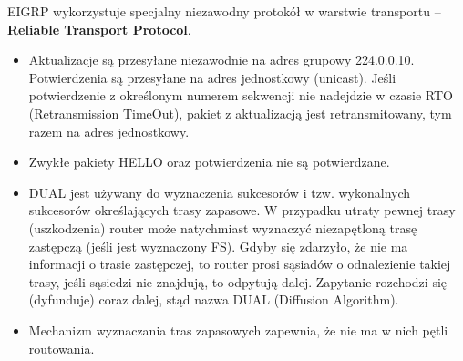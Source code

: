 \documentclass[../main.tex]{subfiles}
\begin{document}
    EIGRP wykorzystuje specjalny niezawodny protokół w warstwie transportu – \textbf{Reliable
    Transport Protocol}.
    \begin{itemize}
        \item Aktualizacje są przesyłane niezawodnie na adres grupowy 224.0.0.10. Potwierdzenia są przesyłane na adres
        jednostkowy (unicast). Jeśli potwierdzenie z określonym numerem sekwencji nie nadejdzie w
        czasie RTO (Retransmission TimeOut), pakiet z aktualizacją jest retransmitowany, tym razem
        na adres jednostkowy.
        \item Zwykłe pakiety HELLO oraz potwierdzenia nie są potwierdzane.
        \item DUAL jest używany do wyznaczenia sukcesorów i tzw. wykonalnych
        sukcesorów określających trasy zapasowe. W przypadku utraty pewnej trasy (uszkodzenia) router może natychmiast wyznaczyć
        niezapętloną trasę zastępczą (jeśli jest wyznaczony FS).  Gdyby się zdarzyło, że nie ma
        informacji o trasie zastępczej, to router prosi sąsiadów o odnalezienie takiej trasy, jeśli
        sąsiedzi nie znajdują, to odpytują dalej. Zapytanie rozchodzi się (dyfunduje) coraz dalej, stąd
        nazwa DUAL (Diffusion Algorithm).
        \item Mechanizm wyznaczania tras zapasowych zapewnia, że nie ma w nich pętli routowania.
    \end{itemize}
\end{document}
